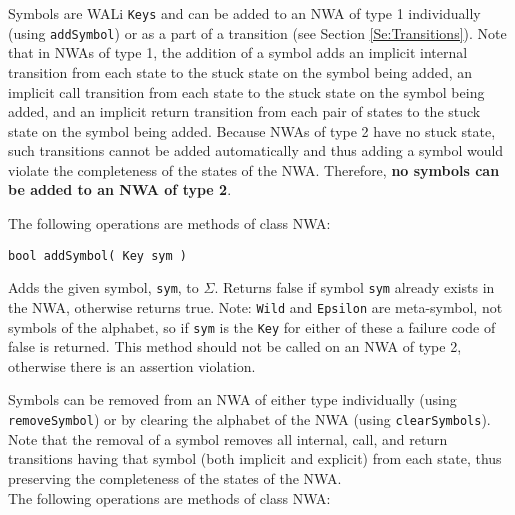 Symbols are WALi \texttt{Keys} and can be added to an NWA of type 1
individually (using \texttt{addSymbol}) or as a part of a transition (see
Section \ref{Se:Transitions}).  Note that in NWAs of type 1, the addition of
a symbol adds an implicit internal transition from each state to the stuck
state on the symbol being added, an implicit call transition from each state
to the stuck state on the symbol being added, and an implicit return
transition from each pair of states to the stuck state on the symbol being
added.  Because NWAs of type 2 have no stuck state, such transitions cannot
be added automatically and thus adding a symbol would violate the
completeness of the states of the NWA.  Therefore, \textbf{no symbols can be
  added to an NWA of type 2}. \\

 \clearpage

\noindent The following operations are methods of class NWA:

\begin{description}

  \item\texttt{bool addSymbol( Key sym )} \nopagebreak

    Adds the given symbol, \texttt{sym}, to $\Sigma$.  Returns false if
    symbol \texttt{sym} already exists in the NWA, otherwise returns true.
    Note: \texttt{Wild} and \texttt{Epsilon} are meta-symbol, not symbols of
    the alphabet, so if \texttt{sym} is the \texttt{Key} for either of these
    a failure code of false is returned.  This method should not be called on
    an NWA of type 2, otherwise there is an assertion violation. \\

\end{description}

Symbols can be removed from an NWA of either type individually (using
\texttt{removeSymbol}) or by clearing the alphabet of the NWA (using
\texttt{clearSymbols}).  Note that the removal of a symbol removes all
internal, call, and return transitions having that symbol (both implicit and
explicit) from each state, thus preserving the completeness of the states of
the NWA. \\

\noindent The following operations are methods of class NWA:

